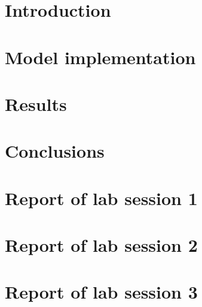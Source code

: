 \documentclass[10pt]{thesis}
\author{Ricard Lado Roigé}
\begin{document}
	\titlepage             %
	\clearpage\mbox{}\clearpage %
	\copyrightpage         %
	\tableofcontents       %
	\listoffigures         %


	\chapter{Introduction}
	

	\chapter{Model implementation}
	

	\chapter{Results}
	

	\chapter{Conclusions}
	


	\begin{singlespace}
		\begin{thebibliography}{99}
			
		\end{thebibliography}
	\end{singlespace}

	\appendix

	\chapter{Report of lab session 1}
	\label{S1Report}
	

	\chapter{Report of lab session 2}
	\label{S2Report}
	

	\chapter{Report of lab session 3}
	\label{S3Report}
	
\end{document}

